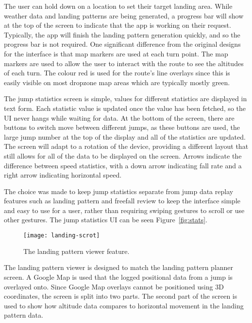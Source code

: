 The user can hold down on a location to set their target landing area. While weather data and landing patterns are being generated, a progress bar will show at the top of the screen to indicate that the app is working on their request. Typically, the app will finish the landing pattern generation quickly, and so the progress bar is not required. One significant difference from the original designs for the interface is that map markers are used at each turn point. The map markers are used to allow the user to interact with the route to see the altitudes of each turn. The colour red is used for the route's line overlays since this is easily visible on most dropzone map areas which are typically mostly green.

The jump statistics screen is simple, values for different statistics are displayed in text form. Each statistic value is updated once the value has been fetched, so the UI never hangs while waiting for data. At the bottom of the screen, there are buttons to switch move between different jumps, as these buttons are used, the large jump number at the top of the display and all of the statistics are updated. The screen will adapt to a rotation of the device, providing a different layout that still allows for all of the data to be displayed on the screen. Arrows indicate the difference between speed statistics, with a down arrow indicating fall rate and a right arrow indicating horizontal speed.

The choice was made to keep jump statistics separate from jump data replay features such as landing pattern and freefall review to keep the interface simple and easy to use for a user, rather than requiring swiping gestures to scroll or use other gestures.
The jump statistics UI can be seen Figure~\ref{fig:stats}.

\begin{wrapfigure}[20]{l}{0.25\textwidth}
    \centering
    \texttt{[image: landing-scrot]}
    \caption{The landing pattern viewer feature.}\label{fig:landing-scrot}
\end{wrapfigure}

The landing pattern viewer is designed to match the landing pattern planner screen. A Google Map is used that the logged positional data from a jump is overlayed onto. Since Google Map overlays cannot be positioned using 3D coordinates, the screen is split into two parts. The second part of the screen is used to show how altitude data compares to horizontal movement in the landing pattern data.

